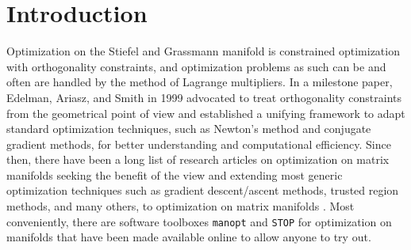 \documentclass[11pt]{article}
\theoremstyle{definition}
\numberwithin{equation}{section}
\begin{document}
\clearpage
\section{Introduction}\label{sec:intro}
Optimization on the Stiefel and Grassmann manifold is  constrained optimization
with orthogonality constraints, and optimization problems as such can be and often are handled
by the method of Lagrange multipliers.
In a milestone paper, Edelman, Ariasz, and Smith \cite{edas:1999} in 1999 advocated to treat orthogonality constraints
from the geometrical point of view and established a unifying framework to adapt standard optimization techniques, such as Newton's method and
conjugate gradient methods, for better
understanding and computational efficiency. Since then, there have been a long list of research articles on
optimization on matrix manifolds seeking the benefit of the view and  extending most generic optimization techniques
such as gradient descent/ascent methods, trusted region methods, and many others, to optimization on matrix manifolds \cite{abms:2008}.
Most conveniently, there are software toolboxes
{\tt manopt} \cite{manopt} and {\tt STOP} \cite{galc:2018,wagl:2021}  for optimization on manifolds that have been made available online
to allow anyone to try out.
\end{document}
